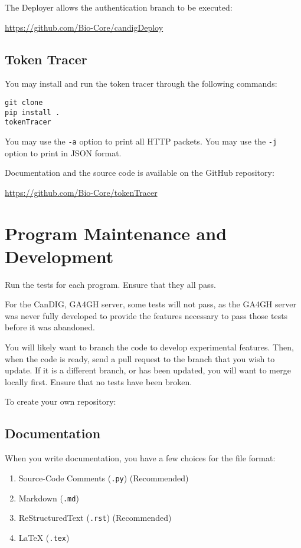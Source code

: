 \documentclass{article}
\begin{document}
The Deployer allows the authentication branch to be executed:

\url{https://github.com/Bio-Core/candigDeploy}

\subsection{Token Tracer}
You may install and run the token tracer through the following commands:
\begin{verbatim}
git clone
pip install .
tokenTracer
\end{verbatim}
You may use the \texttt{-a} option to print all HTTP packets.
You may use the \texttt{-j} option to print in JSON format.

Documentation and the source code is available on the GitHub repository:

\url{https://github.com/Bio-Core/tokenTracer}

\newpage

\section{Program Maintenance and Development}

Run the tests for each program. Ensure that they all pass. 

For the CanDIG, GA4GH server, some tests will not pass, as the GA4GH server was 
never fully developed to provide the features necessary to pass those tests
before it was abandoned.

You will likely want to branch the code to develop experimental features.
Then, when the code is ready, send a pull request to the branch that you wish to 
update.
If it is a different branch, or has been updated, you will want to merge locally first.
Ensure that no tests have been broken.

To create your own repository:


\subsection{Documentation}

When you write documentation, you have a few choices for the file format:

\begin{enumerate}
\item Source-Code Comments (\texttt{.py}) (Recommended)
\item Markdown (\texttt{.md})
\item ReStructuredText (\texttt{.rst}) (Recommended)
\item LaTeX (\texttt{.tex})
\end{enumerate}
\end{document}
